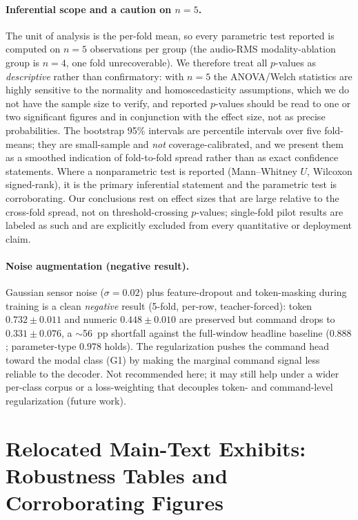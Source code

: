 \documentclass[11pt,a4paper]{article}
\begin{document}
\paragraph{Inferential scope and a caution on $n=5$.} The unit of analysis is the per-fold mean, so every parametric test reported is computed on $n=5$ observations per group (the audio-RMS modality-ablation group is $n=4$, one fold unrecoverable). We therefore treat all $p$-values as \emph{descriptive} rather than confirmatory: with $n=5$ the ANOVA/Welch statistics are highly sensitive to the normality and homoscedasticity assumptions, which we do not have the sample size to verify, and reported $p$-values should be read to one or two significant figures and in conjunction with the effect size, not as precise probabilities. The bootstrap 95\% intervals are percentile intervals over five fold-means; they are small-sample and \emph{not} coverage-calibrated, and we present them as a smoothed indication of fold-to-fold spread rather than as exact confidence statements. Where a nonparametric test is reported (Mann--Whitney $U$, Wilcoxon signed-rank), it is the primary inferential statement and the parametric test is corroborating. Our conclusions rest on effect sizes that are large relative to the cross-fold spread, not on threshold-crossing $p$-values; single-fold pilot results are labeled as such and are explicitly excluded from every quantitative or deployment claim.

\paragraph{Noise augmentation (negative result).} Gaussian sensor noise ($\sigma=0.02$) plus feature-dropout and token-masking during training is a clean \emph{negative} result (5-fold, per-row, teacher-forced): token $0.732 \pm 0.011$ and numeric $0.448 \pm 0.010$ are preserved but command drops to $0.331 \pm 0.076$, a $\sim$56~pp shortfall against the full-window headline baseline ($0.888$; parameter-type $0.978$ holds). The regularization pushes the command head toward the modal class (G1) by making the marginal command signal less reliable to the decoder. Not recommended here; it may still help under a wider per-class corpus or a loss-weighting that decouples token- and command-level regularization (future work).



\section{Relocated Main-Text Exhibits: Robustness Tables and Corroborating Figures}
\label{app:relocated-exhibits}
\end{document}
